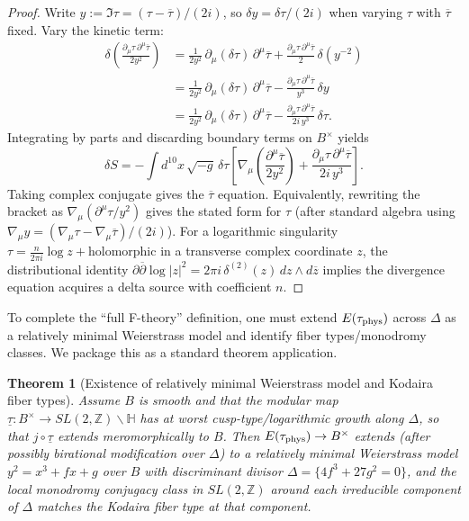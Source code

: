 \documentclass[11pt]{article}
\newtheorem{theorem}{Theorem}[section]
\theoremstyle{remark}
\begin{document}
{\begin{proof}
Write $y:=\Im\tau=(\tau-\overline{\tau})/(2i)$, so $\delta y = \delta\tau/(2i)$ when varying $\tau$ with $\overline{\tau}$ fixed.
Vary the kinetic term:
\begin{align}
\delta\left(\frac{\partial_\mu\tau\,\partial^\mu\overline{\tau}}{2y^2}\right)
&=\frac{1}{2y^2}\,\partial_\mu(\delta\tau)\,\partial^\mu\overline{\tau}
+\frac{\partial_\mu\tau\,\partial^\mu\overline{\tau}}{2}\,\delta(y^{-2}) \nonumber\\
&=\frac{1}{2y^2}\,\partial_\mu(\delta\tau)\,\partial^\mu\overline{\tau}
-\frac{\partial_\mu\tau\,\partial^\mu\overline{\tau}}{y^3}\,\delta y \nonumber\\
&=\frac{1}{2y^2}\,\partial_\mu(\delta\tau)\,\partial^\mu\overline{\tau}
-\frac{\partial_\mu\tau\,\partial^\mu\overline{\tau}}{2i\,y^3}\,\delta\tau.
\end{align}
Integrating by parts and discarding boundary terms on $B^{\times}$ yields
\begin{equation}
\delta S = -\int d^{10}x\,\sqrt{-g}\,\delta\tau\left[
\nabla_\mu\left(\frac{\partial^\mu\overline{\tau}}{2y^2}\right)
+\frac{\partial_\mu\tau\,\partial^\mu\overline{\tau}}{2i\,y^3}
\right].
\end{equation}
Taking complex conjugate gives the $\overline{\tau}$ equation.
Equivalently, rewriting the bracket as $\nabla_\mu(\partial^\mu\tau/y^2)$ gives the stated form for $\tau$
(after standard algebra using $\nabla_\mu y = (\nabla_\mu\tau-\nabla_\mu\overline{\tau})/(2i)$).
For a logarithmic singularity $\tau=\frac{n}{2\pi i}\log z + \text{holomorphic}$ in a transverse complex coordinate $z$,
the distributional identity $\partial\overline{\partial}\log|z|^2 = 2\pi i\,\delta^{(2)}(z)\,dz\wedge d\overline{z}$
implies the divergence equation acquires a delta source with coefficient $n$.
\end{proof}

To complete the “full F-theory” definition, one must extend $E(\tau_{\rm phys})$ across $\Delta$ as a relatively minimal
Weierstrass model and identify fiber types/monodromy classes. We package this as a standard theorem application.

\begin{theorem}[Existence of relatively minimal Weierstrass model and Kodaira fiber types]
\label{thm:Kodaira}
Assume $B$ is smooth and that the modular map
$\underline{\tau}  : B^{\times} \to SL(2,\mathbb{Z}) \backslash \mathbb{H}$
has at worst cusp-type/logarithmic growth along $\Delta$, so that
$j \circ \underline{\tau}$ extends meromorphically to $B$.
Then $E(\tau_{\rm phys})\to B^{\times}$ extends (after possibly birational modification over $\Delta$) to a relatively minimal
Weierstrass model $y^2=x^3+f x+g$ over $B$ with discriminant divisor $\Delta=\{4f^3+27g^2=0\}$,
and the local monodromy conjugacy class in $SL(2,\mathbb{Z})$ around each irreducible component of $\Delta$
matches the Kodaira fiber type at that component.
\end{theorem}

}
\end{document}
